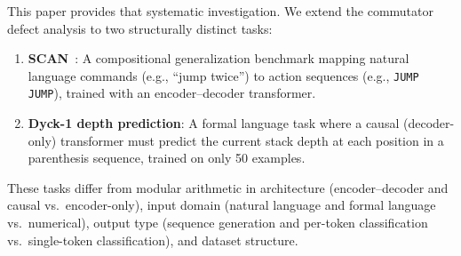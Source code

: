 \documentclass[11pt]{article}
\begin{document}
This paper provides that systematic investigation. We extend the commutator defect analysis to two structurally distinct tasks:
\begin{enumerate}
  \item \textbf{SCAN}~\citep{lake2018generalization}: A compositional generalization benchmark mapping natural language commands (e.g., ``jump twice'') to action sequences (e.g., \texttt{JUMP JUMP}), trained with an encoder--decoder transformer.
  \item \textbf{Dyck-1 depth prediction}: A formal language task where a causal (decoder-only) transformer must predict the current stack depth at each position in a parenthesis sequence, trained on only 50 examples.
\end{enumerate}
These tasks differ from modular arithmetic in architecture (encoder--decoder and causal vs.\ encoder-only), input domain (natural language and formal language vs.\ numerical), output type (sequence generation and per-token classification vs.\ single-token classification), and dataset structure.
\end{document}
